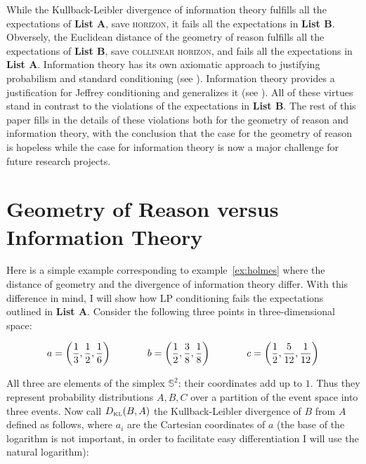 \documentclass[11pt]{article}
\begin{document}
While the Kullback-Leibler divergence of information theory fulfills
all the expectations of \textbf{List A}, save \textsc{horizon}, it fails all
the expectations in \textbf{List B}. Obversely, the Euclidean distance of the
geometry of reason fulfills all the expectations of \textbf{List B}, save
\textsc{collinear horizon}, and fails all the expectations in \textbf{List A}. Information theory has its own axiomatic approach to justifying
probabilism and standard conditioning (see
). Information theory provides a
justification for Jeffrey conditioning and generalizes it (see
). All of these virtues stand in contrast to the
violations of the expectations in \textbf{List B}. The rest of this paper
fills in the details of these violations both for the geometry of
reason and information theory, with the conclusion that the case for
the geometry of reason is hopeless while the case for information
theory is now a major challenge for future research projects.

\section{Geometry of Reason versus Information Theory}
\label{grit}

Here is a simple example corresponding to example~\ref{ex:holmes}
where the distance of geometry and the divergence of information
theory differ. With this difference in mind, I will show how LP
conditioning fails the expectations outlined in \textbf{List A}.
Consider the following three points in three-dimensional space:

\begin{equation}
  \label{eq:e6}
    a=\left(\frac{1}{3},\frac{1}{2},\frac{1}{6}\right) \hspace{.5in}
    b=\left(\frac{1}{2},\frac{3}{8},\frac{1}{8}\right)  \hspace{.5in}
    c=\left(\frac{1}{2},\frac{5}{12},\frac{1}{12}\right)
\end{equation}

All three are elements of the simplex $\mathbb{S}^{2}$: their
coordinates add up to $1$. Thus they represent probability
distributions $A,B,C$ over a partition of the event space into three
events. Now call $D_{\mbox{\tiny KL}}(B,A)$ the Kullback-Leibler
divergence of $B$ from $A$ defined as follows, where $a_{i}$ are the
Cartesian coordinates of $a$ (the base of the logarithm is not
important, in order to facilitate easy differentiation I will use the
natural logarithm):
\end{document}
